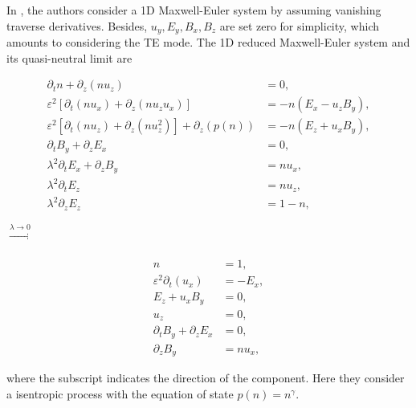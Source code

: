 \documentclass{article}
\begin{document}
In \cite{degond_2012}, the authors consider a 1D Maxwell-Euler system by assuming vanishing traverse derivatives. Besides, $u_y, E_y, B_x, B_z$ are set zero for simplicity, which amounts to considering the TE mode. The 1D reduced Maxwell-Euler system and its quasi-neutral limit are 

\vspace{-0.3cm}
\begin{minipage}{0.6\textwidth}
    \begin{align*}
        \partial_t n + \partial_z(nu_z) &= 0, \\
        \varepsilon^2[\partial_t(nu_x) + \partial_z(nu_zu_x)] &= - n(E_x - u_zB_y), \\
        \varepsilon^2[\partial_t(nu_z) + \partial_z(nu_z^2)] + \partial_z(p(n)) &= -n(E_z + u_xB_y), \\
        \partial_t B_y + \partial_z E_x &= 0, \\
        \lambda^2 \partial_t E_x + \partial_z B_y &= nu_x, \\
        \lambda^2 \partial_t E_z &= nu_z, \\
        \lambda^2 \partial_z E_z &= 1 - n,
    \end{align*}
\end{minipage}
$\xrightarrow[]{\lambda \rightarrow 0}$
\begin{minipage}{0.3\textwidth}
    \begin{align*}
        n &= 1,\\
        \varepsilon^2 \partial_t(u_x) &= - E_x, \\
        E_z + u_xB_y &= 0, \\
        u_z &= 0, \\
        \partial_t B_y + \partial_z E_x &= 0, \\
        \partial_z B_y &= nu_x,
    \end{align*}
\end{minipage}
where the subscript indicates the direction of the component. Here they consider a isentropic process with the equation of state $p(n) = n^\gamma$. 
\end{document}
